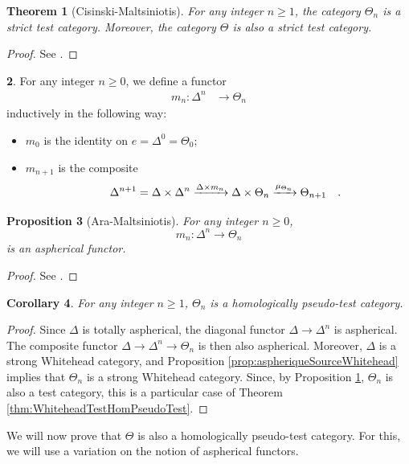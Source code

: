 \documentclass[10pt, english, a4paper, nothms]{amsart}
\theoremstyle{plain}
\newtheorem{theorem}{Theorem}[section]
\newtheorem{prop}[theorem]{Proposition}
\newtheorem{coro}[theorem]{Corollary}
\theoremstyle{remark}
\theoremstyle{definition}
\newtheorem{paragr}[theorem]{}
\numberwithin{equation}{theorem}
\renewcommand\geq\geqslant
\newcommand\zbox[1]{\makebox[0pt][l]{#1}}
\newcommand\pbox[1]{\zbox{\quad #1}} %
\begin{document}
\begin{theorem}[Cisinski-Maltsiniotis]\label{thm:ThetaTestStricte}
For any integer $n\geq1$, the category $\Theta_n$ is a strict test
category. Moreover, the category $\Theta$ is also a strict test
category.
\end{theorem}
\begin{proof}
See \cite{cisinski2011theta}.
\end{proof}


\begin{paragr}\label{def:m_n} 
For any integer $n\geq0$, we define a functor
\begin{align*}
m_n: \Delta^n &\to \Theta_n 
\end{align*}
inductively in the following way:
\begin{itemize}
\item $m_0$ is the identity on $e=\Delta^0=\Theta_0$;
\item $m_{n+1}$ is the composite
\[
\Delta^{n+1} = \Delta \times \Delta^n \xrightarrow{\Delta\times m_n}
\Delta\times\Theta_n \xrightarrow{\mu_{\Theta_n}} \Theta_{n+1} \pbox{.}
\]
\end{itemize}
\end{paragr}

\begin{prop}[Ara-Maltsiniotis]
\label{prop:m_nAspherical}
For any integer $n\geq 0$, 
\[
m_n: \Delta^n \to \Theta_n 
\]
is an aspherical functor.
\end{prop}
\begin{proof}
See \cite[Corollary 5.5]{ara2022compnerfs}. 
\end{proof}

\begin{coro}
For any integer $n\geq 1$, $\Theta_n$ is a homologically pseudo-test
category.
\end{coro}
\begin{proof}
Since $\Delta$ is totally aspherical, the diagonal functor $\Delta \to
\Delta^n$ is aspherical. The composite functor $\Delta \to \Delta^n \to
\Theta_n$ is then also aspherical. Moreover, $\Delta$ is a strong Whitehead
category, and Proposition \ref{prop:aspheriqueSourceWhitehead} implies
that $\Theta_n$ is a strong Whitehead category. Since, by Proposition
\ref{thm:ThetaTestStricte}, $\Theta_n$ is also a test category, this
is a particular case of Theorem \ref{thm:WhiteheadTestHomPseudoTest}.
\end{proof}

We will now prove that $\Theta$ is also a homologically pseudo-test
category. For this, we will use a variation on the notion of aspherical
functors.
\end{document}
